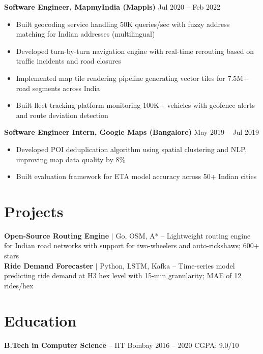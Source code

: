 \documentclass[9pt,a4paper]{article}
\begin{document}
{\footnotesize\bfseries Software Engineer, MapmyIndia (Mappls)} \hfill {\tiny Jul 2020 -- Feb 2022}
\begin{itemize}
    \item Built geocoding service handling 50K queries/sec with fuzzy address matching for Indian addresses (multilingual)
    \item Developed turn-by-turn navigation engine with real-time rerouting based on traffic incidents and road closures
    \item Implemented map tile rendering pipeline generating vector tiles for 7.5M+ road segments across India
    \item Built fleet tracking platform monitoring 100K+ vehicles with geofence alerts and route deviation detection
\end{itemize}

{\footnotesize\bfseries Software Engineer Intern, Google Maps (Bangalore)} \hfill {\tiny May 2019 -- Jul 2019}
\begin{itemize}
    \item Developed POI deduplication algorithm using spatial clustering and NLP, improving map data quality by 8\%
    \item Built evaluation framework for ETA model accuracy across 50+ Indian cities
\end{itemize}

\section{Projects}

{\tiny\bfseries Open-Source Routing Engine} $|$ Go, OSM, A* -- Lightweight routing engine for Indian road networks with support for two-wheelers and auto-rickshaws; 600+ stars\\
{\tiny\bfseries Ride Demand Forecaster} $|$ Python, LSTM, Kafka -- Time-series model predicting ride demand at H3 hex level with 15-min granularity; MAE of 12 rides/hex

\section{Education}

{\footnotesize\bfseries B.Tech in Computer Science} -- IIT Bombay \hfill 2016 -- 2020 \quad CGPA: 9.0/10
\end{document}
